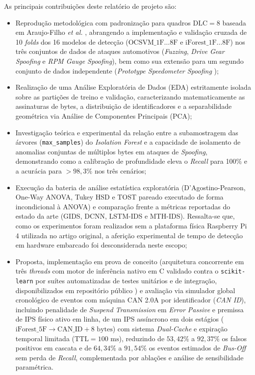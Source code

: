 \documentclass[conference]{IEEEtran}
\begin{document}
As principais contribuições deste relatório de projeto são:
\begin{itemize}
    \item Reprodução metodológica com padronização para quadros $\text{DLC}=8$ baseada em Araujo-Filho \textit{et al.} \cite{araujo2021efficient}, abrangendo a implementação e validação cruzada de 10 \textit{folds} dos 16 modelos de detecção ($\text{OCSVM\_1F}\dots\text{8F}$ e $\text{iForest\_1F}\dots\text{8F}$) nos três conjuntos de dados de ataques automotivos (\textit{Fuzzing}, \textit{Drive Gear Spoofing} e \textit{RPM Gauge Spoofing}), bem como sua extensão para um segundo conjunto de dados independente (\textit{Prototype Speedometer Spoofing} \cite{fourtu_can_dataset});
    \item Realização de uma Análise Exploratória de Dados (EDA) estritamente isolada sobre as partições de treino e validação, caracterizando matematicamente as assinaturas de bytes, a distribuição de identificadores e a separabilidade geométrica via Análise de Componentes Principais (PCA);
    \item Investigação teórica e experimental da relação entre a subamostragem das árvores (\texttt{max\_samples}) do \textit{Isolation Forest} e a capacidade de isolamento de anomalias conjuntas de múltiplos bytes em ataques de \textit{Spoofing}, demonstrando como a calibração de profundidade eleva o \textit{Recall} para 100\% e a acurácia para $>98{,}3\%$ nos três cenários;
    \item Execução da bateria de análise estatística exploratória (D'Agostino-Pearson, One-Way ANOVA, Tukey HSD e TOST pareado executado de forma incondicional à ANOVA) e comparação frente a métricas reportadas do estado da arte (GIDS, DCNN, LSTM-IDS e MTH-IDS). Ressalta-se que, como os experimentos foram realizados sem a plataforma física Raspberry Pi 4 utilizada no artigo original, a aferição experimental de tempo de detecção em hardware embarcado foi desconsiderada neste escopo;
    \item Proposta, implementação em prova de conceito (arquitetura concorrente em três \textit{threads} com motor de inferência nativo em C validado contra o \texttt{scikit-learn} por suítes automatizadas de testes unitários e de integração, disponibilizados em repositório público \cite{repo_replication}) e avaliação via simulador global cronológico de eventos com máquina CAN 2.0A por identificador (\textit{CAN ID}), incluindo penalidade de \textit{Suspend Transmission} em \textit{Error Passive} e premissa de IPS físico ativo em linha, de um IPS assíncrono em dois estágios ($\text{iForest\_5F} \rightarrow \text{CAN\_ID} + 8\text{ bytes}$) com sistema \textit{Dual-Cache} e expiração temporal limitada ($\text{TTL}=100\text{ ms}$), reduzindo de $53{,}42\%$ a $92{,}37\%$ os falsos positivos em cascata e de $64{,}34\%$ a $91{,}54\%$ os eventos estimados de \textit{Bus-Off} sem perda de \textit{Recall}, complementada por ablações e análise de sensibilidade paramétrica.
\end{itemize}
\end{document}
